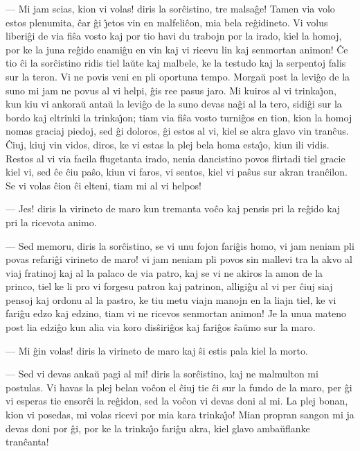 --- Mi jam scias, kion vi volas! diris la sor\^cistino, tre malsa\^ge!
Tamen via volo estos plenumita, \^car \^gi \^{\j}etos vin en
malfeli\^con, mia bela re\^gidineto. Vi volus liberi\^gi de via
fi\^sa vosto kaj por tio havi du trabojn por la irado, kiel la
homoj, por ke la juna re\^gido enami\^gu en vin kaj vi ricevu lin
kaj senmortan animon! \^Ce tio \^ci la sor\^cistino ridis tiel la\u
ute kaj malbele, ke la testudo kaj la serpentoj falis sur la teron.
Vi ne povis veni en pli oportuna tempo. Morga\u u post la levi\^go
de la suno mi jam ne povus al vi helpi, \^gis ree pasus jaro. Mi
kuiros al vi trinka\^{\j}on, kun kiu vi ankora\u u anta\u u la
levi\^go de la suno devas na\^gi al la tero, sidi\^gi sur la bordo
kaj eltrinki la trinka\^{\j}on; tiam via fi\^sa vosto turni\^gos en
tion, kion la homoj nomas graciaj piedoj, sed \^gi doloros, \^gi
estos al vi, kiel se akra glavo vin tran\^cus. \^Ciuj, kiuj vin
vidos, diros, ke vi estas la plej bela homa esta\^{\j}o, kiun ili
vidis. Restos al vi via facila flugetanta irado, nenia dancistino
povos flirtadi tiel gracie kiel vi, sed \^ce \^ciu pa\^so, kiun vi
faros, vi sentos, kiel vi pa\^sus sur akran tran\^cilon. Se vi volas
\^cion \^ci elteni, tiam mi al vi helpos!

 --- Jes! diris la virineto de maro kun tremanta vo\^co kaj pensis pri
la re\^gido kaj pri la ricevota animo.

 --- Sed memoru, diris la sor\^cistino, se vi unu fojon fari\^gis homo,
vi jam neniam pli povas refari\^gi virineto de maro! vi jam neniam
pli povos sin mallevi tra la akvo al viaj fratinoj kaj al la palaco
de via patro, kaj se vi ne akiros la amon de la princo, tiel ke li
pro vi forgesu patron kaj patrinon, alligi\^gu al vi per \^ciuj siaj
pensoj kaj ordonu al la pastro, ke tiu metu viajn manojn en la liajn
tiel, ke vi fari\^gu edzo kaj edzino, tiam vi ne ricevos senmortan
animon! Je la unua mateno post lia edzi\^go kun alia via koro
dis\^siri\^gos kaj fari\^gos \^sa\u umo sur la maro.

 --- Mi \^gin volas! diris la virineto de maro kaj \^si estis pala kiel
la morto.

 --- Sed vi devas anka\u u pagi al mi! diris la sor\^cistino, kaj ne
malmulton mi postulas. Vi havas la plej belan vo\^con el \^ciuj tie
\^ci sur la fundo de la maro, per \^gi vi esperas tie ensor\^ci la
re\^gidon, sed la vo\^con vi devas doni al mi. La plej bonan, kion
vi posedas, mi volas ricevi por mia kara trinka\^{\j}o! Mian propran
sangon mi ja devas doni por \^gi, por ke la trinka\^{\j}o fari\^gu
akra, kiel glavo amba\u uflanke tran\^canta!

